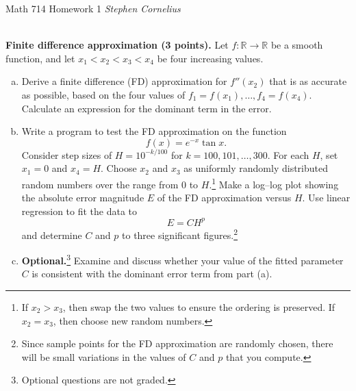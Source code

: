 \documentclass{article}
\def\R{{\mathbb R}}
\begin{document}
\begin{center}
    Math 714
    \hfill Homework 1
    \hfill \textit{Stephen Cornelius}
\end{center}


\begin{problem} \\ 
  \textbf{Finite difference approximation (3 points).}
        Let $f: \R \to \R$ be a smooth function, and let $x_1<x_2<x_3<x_4$ be
        four increasing values.
        \begin{enumerate}[a)]
          \item Derive a finite difference (FD) approximation for $f''(x_2)$ that
                is as accurate as possible, based on the four values of $f_1=f(x_1),
                  \ldots, f_4 = f(x_4)$. Calculate an expression for the dominant term
                in the error.
          \item Write a program to test the FD approximation
                on the function
                \begin{equation}
                  f(x) = e^{-x} \tan x.
                \end{equation}
                Consider step sizes of $H=10^{-k/100}$ for $k={100,101,\ldots,300}$.
                For each $H$, set $x_1=0$ and $x_4=H$. Choose $x_2$ and $x_3$ as uniformly
                randomly distributed random numbers over the range from $0$ to
                $H$.\footnote{If $x_2>x_3$, then swap the two values to ensure the
                  ordering is preserved. If $x_2=x_3$, then choose new random numbers.}
                Make a log--log plot showing the absolute error magnitude $E$ of the FD
                approximation versus $H$. Use linear regression to fit the data to
                \begin{equation}
                  E = C H^p
                \end{equation}
                and determine $C$ and $p$ to three significant figures.\footnote{Since sample
                  points for the FD approximation are randomly chosen, there will be
                  small variations in the values of $C$ and $p$ that you compute.}
          \item \textbf{Optional.}\footnote{Optional questions are not graded.}
                Examine and discuss whether your value of the
                fitted parameter $C$ is consistent with the dominant error term from
                part (a).
        \end{enumerate}
\end{problem}
\end{document}
